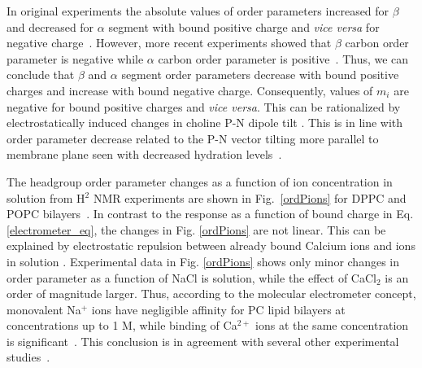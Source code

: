 \documentclass[pre,aps,floatfix,authordate1-4,twocolumn]{revtex4-1}
\begin{document}
In original experiments the absolute values of order parameters 
increased for $\beta$ and decreased for $\alpha$ segment with bound positive charge
and {\it vice versa} for negative charge~\cite{akutsu81,altenbach84,altenbach85,seelig87,scherer89,rydall92}. 
However, more recent experiments showed that 
$\beta$ carbon order parameter is negative while $\alpha$ carbon order parameter is 
positive~\cite{hong95a,hong95b,gross97}. Thus, we can conclude 
that $\beta$ and $\alpha$ segment order parameters decrease with bound positive charges 
and increase with bound negative charge. Consequently, values of $m_i$ are negative for
bound positive charges and {\it vice versa}. This can be rationalized by electrostatically 
induced changes in choline P-N dipole tilt \cite{seelig87,scherer89,seelig90}. 
This is in line with order parameter decrease related to the P-N vector tilting more parallel to membrane plane 
seen with decreased hydration levels~\cite{botan15}. 


The headgroup order parameter changes as a function of ion concentration in
solution from H$^2$ NMR experiments are shown in Fig.~\ref{ordPions} for DPPC and POPC bilayers~\cite{akutsu81,altenbach84}.
In contrast to the response as a function of bound charge in 
Eq. \ref{electrometer_eq}, the changes in Fig. \ref{ordPions}
are not linear. This can be explained by electrostatic repulsion between
already bound Calcium ions and ions in solution \cite{altenbach84}.
Experimental data in Fig. \ref{ordPions} shows only minor changes in order
parameter as a function of NaCl is solution, 
while the effect of CaCl$_2$ is an order of magnitude larger. 
Thus, according to the molecular electrometer concept, 
monovalent Na$^+$ ions have negligible affinity for PC lipid bilayers at concentrations up to 1 M,
while binding of Ca$^{2+}$ ions at the same concentration is significant~\cite{akutsu81,altenbach84}. 
This conclusion is in agreement with several other experimental 
studies~\cite{cevc90,tocanne90,binder02,pabst07,filippov09}.
\end{document}

